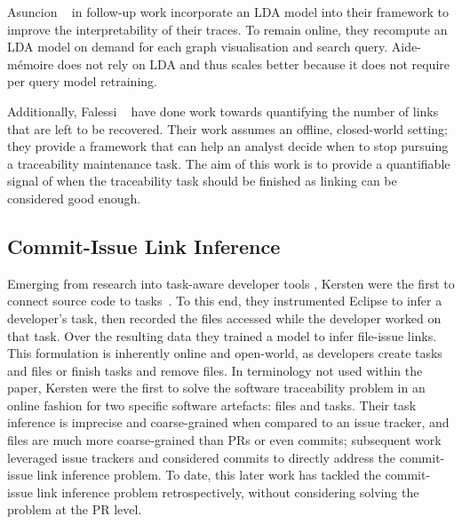 Asuncion \etal~\cite{TopicTraceability} in follow-up work incorporate an LDA
model into their framework to improve the interpretability of their traces. To
remain online, they recompute an LDA model on demand for each graph
visualisation and search query. Aide-mémoire does not rely on LDA and thus
scales better because it does not require per query model retraining.

Additionally, Falessi \etal~\cite{Falessi2017} have done work towards
quantifying the number of links that are left to be recovered. Their work
assumes an offline, closed-world setting; they provide a framework that can help
an analyst decide when to stop pursuing a traceability maintenance task. The aim
of this work is to provide a quantifiable signal of when the traceability task
should be finished as linking can be considered good enough.

\subsection{Commit-Issue Link Inference}
\label{chapter:literature:sec:am_rel_work:cli}


Emerging from research into task-aware developer tools
\cite{Robillard:2003:FTL:776816.776969}, Kersten \etal were the first to connect
source code to tasks~\cite{Kersten2005}. To this end, they instrumented Eclipse
to infer a developer's task, then recorded the files accessed while the
developer worked on that task. Over the resulting data they trained a model to
infer file-issue links. This formulation is inherently online and open-world, as
developers create tasks and files or finish tasks and remove files. In
terminology not used within the paper, Kersten \etal were the first to solve the
software traceability problem in an online fashion for two specific software
artefacts: files and tasks. Their task inference is imprecise and coarse-grained
when compared to an issue tracker, and files are much more coarse-grained than
PRs or even commits; subsequent work leveraged issue trackers and considered
commits to directly address the commit-issue link inference problem. To date,
this later work has tackled the commit-issue link inference problem
retrospectively, without considering solving the problem at the PR level. 


